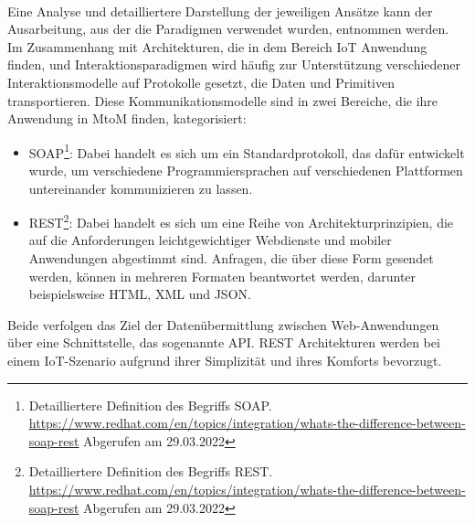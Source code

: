         \\
        \pagebreak
        \linebreak
        Eine Analyse und detailliertere Darstellung der jeweiligen Ansätze kann der Ausarbeitung, aus der die Paradigmen verwendet wurden, entnommen werden.
        \\
        \linebreak
        Im Zusammenhang mit Architekturen, die in dem Bereich \acs{IoT} Anwendung finden, und Interaktionsparadigmen wird häufig zur Unterstützung 
        verschiedener Interaktionsmodelle auf Protokolle gesetzt, die Daten und Primitiven transportieren. Diese Kommunikationsmodelle sind in zwei 
        Bereiche, die ihre Anwendung in \ac{MtoM} finden, kategorisiert:
        \\
        \begin{itemize}
            \item \ac{SOAP}\footnote{Detailliertere Definition des Begriffs SOAP. \url{https://www.redhat.com/en/topics/integration/whats-the-difference-between-soap-rest} Abgerufen am 29.03.2022}: 
            Dabei handelt es sich um ein Standardprotokoll, das dafür entwickelt wurde, 
            um verschiedene Programmiersprachen auf verschiedenen Plattformen untereinander 
            kommunizieren zu lassen.
            \item \ac{REST}\footnote{Detailliertere Definition des Begriffs REST. \url{https://www.redhat.com/en/topics/integration/whats-the-difference-between-soap-rest} Abgerufen am 29.03.2022}: 
            Dabei handelt es sich um eine Reihe von Architekturprinzipien, die auf 
            die Anforderungen leichtgewichtiger Webdienste und mobiler Anwendungen abgestimmt sind. 
            Anfragen, die über diese Form gesendet werden, können in mehreren Formaten beantwortet 
            werden, darunter beispielsweise \ac{HTML}, \ac{XML} und \ac{JSON}.
        \end{itemize}
        Beide verfolgen das Ziel der Datenübermittlung zwischen Web-Anwendungen über eine Schnittstelle, das sogenannte \ac{API}.
        \acs{REST} Architekturen werden bei einem \acs{IoT}-Szenario aufgrund ihrer Simplizität und ihres Komforts bevorzugt. \cite{IEEE2015} 

